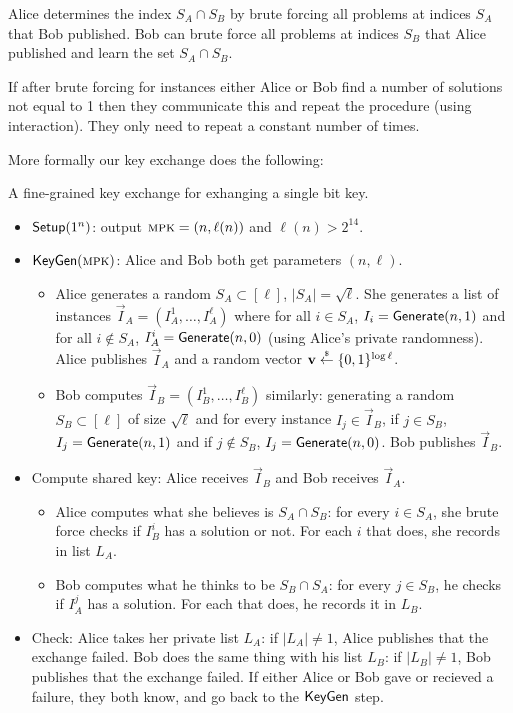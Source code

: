 Alice determines the index $S_A \cap S_B$ by brute forcing all problems at indices $S_A$ that Bob published. Bob can brute force all problems at indices $S_B$ that Alice published and learn the set  $S_A \cap S_B$. 

If after brute forcing for instances either Alice or Bob find a number of solutions not equal to 1 then they communicate this and repeat the procedure (using interaction). They only need to repeat a constant number of times. 

More formally our key exchange does the following:
\begin{construction}\label{const:fg-interactive-keyxc}
	A fine-grained key exchange for exhanging a single bit key.
	\begin{itemize}
		\item $\mathsf{Setup}(1^n)$: output $\textsc{mpk}= (n, \ell(n))$ and $\ell(n)>2^{14}$.
		\item $\textsf{KeyGen}(\textsc{mpk})$: Alice and Bob both get parameters $(n,\ell)$.
		\begin{itemize}
			\item Alice generates a random $S_A \subset [\ell]$, $|S_A| = \sqrt \ell$. She generates a list of instances $\vec I_A = (I_A^1, \ldots, I_A^\ell)$ where for all $i \in S_A$, $I_i = \mathsf{Generate}(n,1)$ and for all $i \nin S_A$, $I_A^i = \mathsf{Generate}(n,0)$ (using Alice's private randomness). Alice publishes $\vec I_A$ and a random vector $\mathbf v \stackrel{\scriptscriptstyle{\$}}{\gets} \{0,1\}^{ \log \ell }$.
			\item Bob computes $\vec I_B = (I_B^1, \ldots, I_B^\ell)$ similarly: generating a random $S_B \subset [\ell]$ of size $\sqrt \ell$ and for every instance $I_j \in \vec I_B$, if $j \in S_B$, $I_j = \mathsf{Generate}(n,1)$ and if $j \nin S_B$, $I_j = \mathsf{Generate}(n,0)$. Bob publishes $\vec I_B$.
		\end{itemize}
		\item Compute shared key: Alice receives $\vec I_B$ and Bob receives $\vec I_A$.
		\begin{itemize}
			\item Alice computes what she believes is $S_A \cap S_B$: for every $i \in S_A$, she brute force checks if $I_B^i$ has a solution or not. For each $i$ that does, she records in list $L_A$. 
			\item Bob computes what he thinks to be $S_B \cap S_A$: for every $j \in S_B$, he checks if $I_A^j$ has a solution. For each that does, he records it in $L_B$.
		\end{itemize}
		\item Check: Alice takes her private list $L_A$: if $|L_A| \neq 1$, Alice publishes that the exchange failed. Bob does the same thing with his list $L_B$: if $|L_B| \neq 1$, Bob publishes that the exchange failed. If either Alice or Bob gave or recieved a failure, they both know, and go back to the $\textsf{KeyGen}$ step.
		

\end{itemize}
\end{construction}

